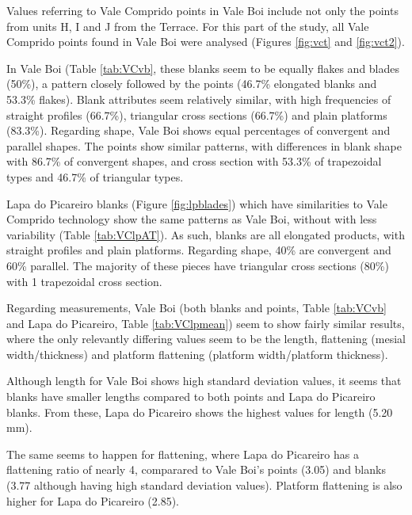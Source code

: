 \documentclass[12pt,twoside]{reedthesis}
\begin{document}
Values referring to Vale Comprido points in Vale Boi include not only the points from units H, I and J from the Terrace. For this part of the study, all Vale Comprido points found in Vale Boi were analysed (Figures \ref{fig:vct} and \ref{fig:vct2}).

In Vale Boi (Table \ref{tab:VCvb}, these blanks seem to be equally flakes and blades (50\%), a pattern closely followed by the points (46.7\% elongated blanks and 53.3\% flakes). Blank attributes seem relatively similar, with high frequencies of straight profiles (66.7\%), triangular cross sections (66.7\%) and plain platforms (83.3\%). Regarding shape, Vale Boi shows equal percentages of convergent and parallel shapes. The points show similar patterns, with differences in blank shape with 86.7\% of convergent shapes, and cross section with 53.3\% of trapezoidal types and 46.7\% of triangular types.

Lapa do Picareiro blanks (Figure \ref{fig:lpblades}) which have similarities to Vale Comprido technology show the same patterns as Vale Boi, without with less variability (Table \ref{tab:VClpAT}). As such, blanks are all elongated products, with straight profiles and plain platforms. Regarding shape, 40\% are convergent and 60\% parallel. The majority of these pieces have triangular cross sections (80\%) with 1 trapezoidal cross section.

Regarding measurements, Vale Boi (both blanks and points, Table \ref{tab:VCvb} and Lapa do Picareiro, Table \ref{tab:VClpmean}) seem to show fairly similar results, where the only relevantly differing values seem to be the length, flattening (mesial width/thickness) and platform flattening (platform width/platform thickness).

Although length for Vale Boi shows high standard deviation values, it seems that blanks have smaller lengths compared to both points and Lapa do Picareiro blanks. From these, Lapa do Picareiro shows the highest values for length (5.20 mm).

The same seems to happen for flattening, where Lapa do Picareiro has a flattening ratio of nearly 4, comparared to Vale Boi's points (3.05) and blanks (3.77 although having high standard deviation values). Platform flattening is also higher for Lapa do Picareiro (2.85).
\end{document}
